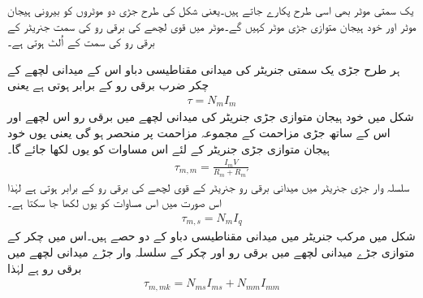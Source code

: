 یک سمتی موٹر بھی اسی طرح پکارے جاتے ہیں۔یعنی شکل   کی طرح جڑی دو موٹروں کو بیرونی ہیجان موٹر اور خود ہیجان متوازی جڑی موٹر کہیں گے۔موٹر میں قوی لچھے کی برقی رو کی سمت جنریٹر کے برقی رو کی سمت کے اُلٹ ہوتی ہے۔

ہر طرح جڑی یک سمتی جنریٹر کی میدانی مقناطیسی دباو اس کے میدانی لچھے کے چکر ضرب برقی رو کے برابر ہوتی ہے یعنی
\begin{align}
\tau=N_m I_m
\end{align}
شکل   میں خود ہیجان متوازی جڑی جنریٹر کی میدانی لچھے میں برقی رو اس لچھے اور اس کے ساتھ جڑی مزاحمت کے مجموعہ  مزاحمت  پر منحصر ہو گی یعنی  یوں خود ہیجان متوازی جڑی جنریٹر کے لئے اس مساوات کو یوں لکھا جائے گا۔
\begin{align}
\tau_{m,m}=\frac{I_m V}{R_m+R_m'}
\end{align}
سلسلہ وار جڑی جنریٹر میں میدانی برقی رو جنریٹر کے قوی لچھے کی برقی رو کے برابر ہوتی ہے لہٰذا اس صورت میں اس مساوات کو یوں لکھا جا سکتا ہے۔
\begin{align}
\tau_{m,s}=N_m I_q
\end{align}
شکل   میں مرکب جنریٹر میں میدانی مقناطیسی دباو کے دو حصے ہیں۔اس میں  چکر کے متوازی جڑے میدانی لچھے میں برقی رو   اور   چکر کے سلسلہ وار جڑے میدانی لچھے میں  برقی رو  ہے لہٰذا
\begin{align}
\tau_{m,mk}=N_{ms} I_{ms}+N_{mm} I_{mm}
\end{align}

